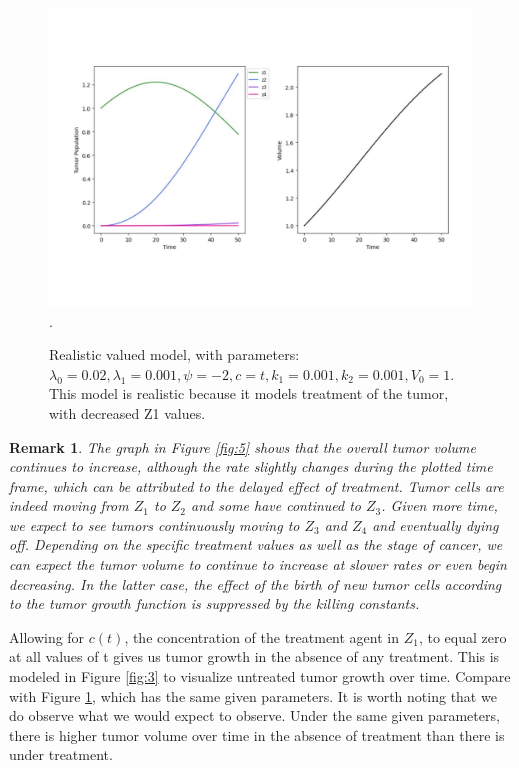 \documentclass[11pt,reqno]{amsart}
\newtheorem*{remark}{Remark}
\begin{document}
\begin{figure}[h]
\begin{center} %
\includegraphics[width=\textwidth]{parameters_like_paper.pdf}. %
\end{center}
\caption{Realistic valued model, with parameters: $\lambda_0=0.02, \lambda_1=0.001, \psi=-2, c=t, k_1=0.001, k_2=0.001, V_0=1$. This model is realistic because it models treatment of the tumor, with decreased Z1 values.}
\label{fig:2}
\end{figure}


\begin{remark}
\label{Remark 1.2}
    The graph in Figure \ref{fig:5} shows that the overall tumor volume continues to increase, although the rate slightly changes during the plotted time frame, which can be attributed to the delayed effect of treatment. Tumor cells are indeed moving from $Z_1$ to $Z_2$ and some have continued to $Z_3$. Given more time, we expect to see tumors continuously moving to $Z_3$ and $Z_4$ and eventually dying off. Depending on the specific treatment values as well as the stage of cancer, we can expect the tumor volume to continue to increase at slower rates or even begin decreasing. In the latter case, the effect of the birth of new tumor cells according to the tumor growth function is suppressed by the killing constants.
\end{remark}

Allowing for $c(t)$, the concentration of the treatment agent in $Z_1$, to equal zero at all values of t gives us tumor growth in the absence of any treatment. This is modeled in Figure \ref{fig:3} to visualize untreated tumor growth over time. Compare with Figure \ref{fig:2}, which has the same given parameters. It is worth noting that we do observe what we would expect to observe. Under the same given parameters, there is higher tumor volume over time in the absence of treatment than there is under treatment.
\end{document}
